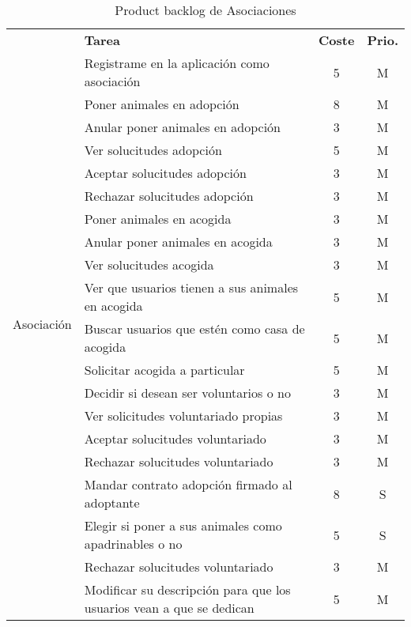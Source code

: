 \begin{table}[H]
    \centering
    \begin{tabular}{|c |p{8cm}|c |c|} \hline 
         \multirow[c]{23}{*}{Asociación}&  \textbf{Tarea}&  \textbf{Coste}& \textbf{Prio.}\\  \cline{2-4}
         
         &  Registrame en la aplicación como asociación&  5& M\\ \cline{2-4} 
         &  Poner animales en adopción&  8& M\\ \cline{2-4} 
         &  Anular poner animales en adopción&  3& M\\ \cline{2-4} 
         &  Ver solucitudes adopción&  5& M\\ \cline{2-4}
         &  Aceptar solucitudes adopción&  3& M\\ \cline{2-4}
         &  Rechazar solucitudes adopción&  3& M\\ \cline{2-4}
         
         
         &  Poner animales en acogida&  3& M\\ \cline{2-4}
         &  Anular poner animales en acogida&  3& M\\ \cline{2-4} 
         &  Ver solucitudes acogida&  3& M\\ \cline{2-4}
        
         &  Ver que usuarios tienen a sus animales en acogida&  5& M\\ \cline{2-4}
         &  Buscar usuarios que estén como casa de acogida&  5& M\\ \cline{2-4}
         &  Solicitar acogida a particular &  5& M\\ \cline{2-4}
         
         
         &  Decidir si desean ser voluntarios o no&  3& M\\ \cline{2-4}
         &  Ver solicitudes voluntariado propias&  3& M\\ \cline{2-4}
         &  Aceptar solucitudes voluntariado&  3& M\\ \cline{2-4}
         &  Rechazar solucitudes voluntariado&  3& M\\ \cline{2-4}
         
         &  Mandar contrato adopción firmado al adoptante&  8& S\\ \cline{2-4}
         
         &  Elegir si poner a sus animales como apadrinables o no &  5& S\\ \cline{2-4}
         &  Rechazar solucitudes voluntariado&  3& M\\ \cline{2-4}
         
         &  Modificar su descripción para que los usuarios vean a que se dedican & 5 & M \\ \hline

         
         
        
    \end{tabular}
    \caption{Product backlog de Asociaciones}
    \label{tab:pb_asociaciones}
\end{table}


